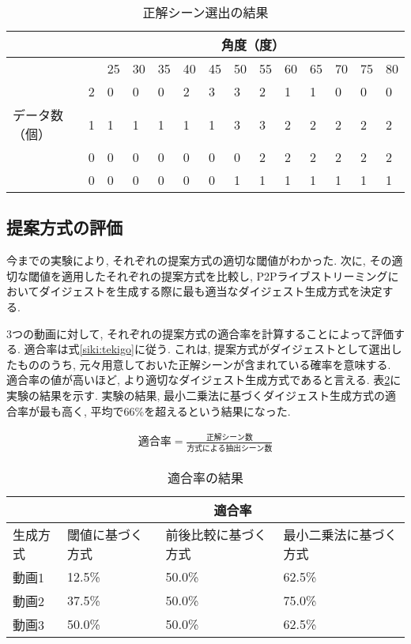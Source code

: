 \begin{table}[h]
  \caption{正解シーン選出の結果}
  \label{tbl:digest3-1}
  \centering
      {\small
        \begin{tabular}{|l|l||l|l|l|l|l|l|l|l|l|l|l|l|} \hline
          & & \multicolumn{12}{|c|}{角度（度）} \\ \hline
          & & 25 & 30 & 35 & 40 & 45 & 50 & 55 & 60 & 65 & 70 & 75 & 80 \\ \hline \hline
          & 2 & 0 & 0 & 0 & 2 & 3 & 3 & 2 & 1 & 1 & 0 & 0 & 0 \\ \cline{2-14}
          データ数（個） & 1 & 1 & 1 & 1 & 1 & 1 & 3 & 3 & 2 & 2 & 2 & 2 & 2 \\ \cline{2-14}
          & 0 & 0 & 0 & 0 & 0 & 0 & 0 & 2 & 2 & 2 & 2 & 2 & 2 \\ \cline{2-14}
          & 0 & 0 & 0 & 0 & 0 & 0 & 1 & 1 & 1 & 1 & 1 & 1 & 1 \\ \cline{2-14}
          \hline
        \end{tabular}
      }
\end{table}

\subsection{提案方式の評価}
今までの実験により, それぞれの提案方式の適切な閾値がわかった. 次に, その適切な閾値を適用したそれぞれの提案方式を比較し, P2Pライブストリーミングにおいてダイジェストを生成する際に最も適当なダイジェスト生成方式を決定する.

3つの動画に対して, それぞれの提案方式の適合率を計算することによって評価する. 適合率は式\ref{siki:tekigo}に従う. これは, 提案方式がダイジェストとして選出したもののうち, 元々用意しておいた正解シーンが含まれている確率を意味する. 適合率の値が高いほど, より適切なダイジェスト生成方式であると言える. 表\ref{tbl:tekigo}に実験の結果を示す. 実験の結果, 最小二乗法に基づくダイジェスト生成方式の適合率が最も高く, 平均で66\%を超えるという結果になった.

\begin{eqnarray}
  適合率 = \frac{正解シーン数}{方式による抽出シーン数}
  \label{siki:tekigo}
\end{eqnarray}

\begin{table}[h]
  \caption{適合率の結果}
  \label{tbl:tekigo}
  \centering
      {\small
        \begin{tabular}{|l|l|l|l|} \hline
          & \multicolumn{3}{|c|}{適合率} \\ \hline
          生成方式 & 閾値に基づく方式 & 前後比較に基づく方式 & 最小二乗法に基づく方式 \\ \hline
          動画1 & 12.5\% & 50.0\% & 62.5\% \\ \hline
          動画2 & 37.5\% & 50.0\% & 75.0\% \\ \hline
          動画3 & 50.0\% & 50.0\% & 62.5\% \\ \hline
        \end{tabular}
      }
\end{table}

